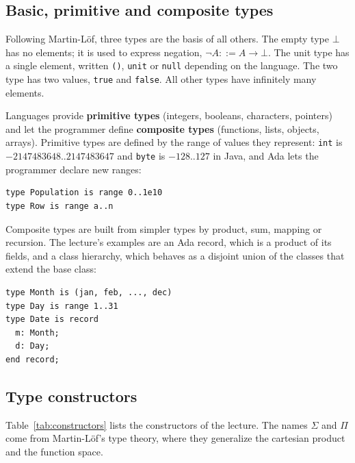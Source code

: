 \subsection{Basic, primitive and composite types}

Following Martin-L\"of, three types are the basis of all others. The empty
type $\bot$ has no elements; it is used to express negation, $\neg A ::= A \to
\bot$. The unit type has a single element, written \texttt{()}, \texttt{unit} or
\texttt{null} depending on the language. The two type has two values,
\texttt{true} and \texttt{false}. All other types have infinitely many elements.

Languages provide \textbf{primitive types} (integers, booleans, characters,
pointers) and let the programmer define \textbf{composite types} (functions,
lists, objects, arrays). Primitive types are defined by the range of values
they represent: \texttt{int} is $-2147483648..2147483647$ and \texttt{byte} is
$-128..127$ in Java, and Ada lets the programmer declare new ranges:
\begin{lstlisting}
type Population is range 0..1e10
type Row is range a..n
\end{lstlisting}
Composite types are built from simpler types by product, sum, mapping or
recursion. The lecture's examples are an Ada record, which is a product of
its fields, and a class hierarchy, which behaves as a disjoint union of the
classes that extend the base class:
\begin{lstlisting}
type Month is (jan, feb, ..., dec)
type Day is range 1..31
type Date is record
  m: Month;
  d: Day;
end record;
\end{lstlisting}

\subsection{Type constructors}

Table~\ref{tab:constructors} lists the constructors of the lecture. The names
$\Sigma$ and $\Pi$ come from Martin-L\"of's type theory, where they generalize
the cartesian product and the function space.

